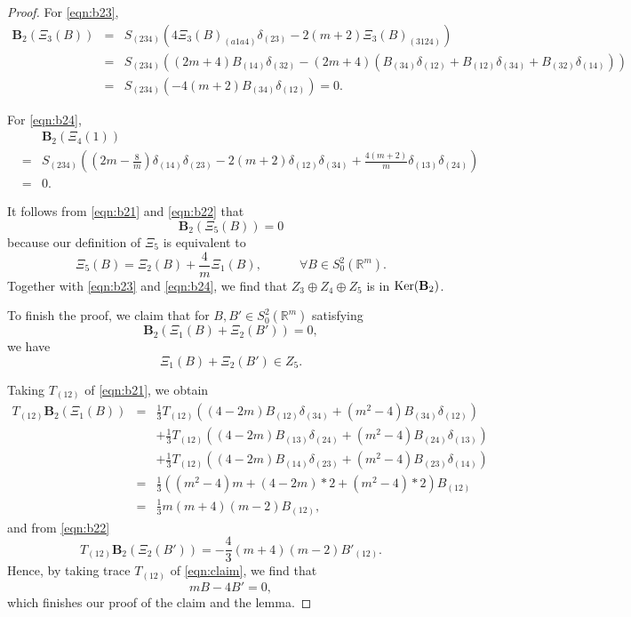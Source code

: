 \documentclass{amsart}
\newcommand{\Real}{\mathbb R}
\numberwithin{equation}{section}
\begin{document}
\begin{proof}
	For \eqref{eqn:b23}, 
	\begin{eqnarray*}
		{\mathbf B}_2(\Xi_3(B)) &=&S_{(234)} (4 \Xi_3(B)_{(a1a4)}\delta_{(23)} - 2(m+2) \Xi_3(B)_{(3124)}) \\
					&=& S_{(234)} \left( (2m+4)B_{(14)}\delta_{(32)} -(2m+4)(B_{(34)}\delta_{(12)}+B_{(12)}\delta_{(34)}+B_{(32)}\delta_{(14)}) \right) \\
					&=&S_{(234)}\left( -4(m+2) B_{(34)}\delta_{(12)} \right) =0.
	\end{eqnarray*}

	For \eqref{eqn:b24},
	\begin{eqnarray*}
	&& {\mathbf B}_2(\Xi_4(1))\\
	&=&S_{(234)} \left( (2m-\frac{8}{m}) \delta_{(14)}\delta_{(23)}-2(m+2)\delta_{(12)}\delta_{(34)}+ \frac{4(m+2)}{m}\delta_{(13)}\delta_{(24)} \right) \\
	&=&0.
	\end{eqnarray*}

	It follows from \eqref{eqn:b21} and \eqref{eqn:b22} that
	$$
	{\mathbf B}_2(\Xi_5(B))=0
	$$
	because our definition of $\Xi_5$ is equivalent to
	$$
	\Xi_5(B)= \Xi_2(B) + \frac{4}{m} \Xi_1(B), \qquad \text{} \quad \forall B\in S_0^2(\Real^m).
	$$
	Together with \eqref{eqn:b23} and \eqref{eqn:b24}, we find that $Z_3\oplus Z_4\oplus Z_5$ is in ${\rm Ker}({\mathbf B}_2)$. 

	To finish the proof, we claim that for $B, B'\in S^2_0(\Real^m)$ satisfying
	\begin{equation}
		\label{eqn:claim}
		{\mathbf B}_2 \left( \Xi_1(B)+ \Xi_2(B') \right)=0,
	\end{equation}
	we have
	$$
	\Xi_1(B)+\Xi_2(B')\in Z_5.
	$$

	Taking $T_{(12)}$ of \eqref{eqn:b21}, we obtain
	\begin{eqnarray*}
		T_{(12)} {\mathbf B}_2(\Xi_1(B)) &=& \frac{1}{3}T_{(12)} \left( (4-2m)B_{(12)}\delta_{(34)} + (m^2-4) B_{(34)}\delta_{(12)} \right) \\
						 &&+  \frac{1}{3}T_{(12)} \left( (4-2m)B_{(13)}\delta_{(24)} + (m^2-4) B_{(24)}\delta_{(13)} \right) \\
						 &&+  \frac{1}{3}T_{(12)} \left( (4-2m)B_{(14)}\delta_{(23)} + (m^2-4) B_{(23)}\delta_{(14)} \right) \\
						 &=& \frac{1}{3}\left( (m^2-4)m+ (4-2m)*2 + (m^2-4)*2 \right) B_{(12)}\\
						 &=&\frac{1}{3}m(m+4)(m-2) B_{(12)},
	\end{eqnarray*}
	and from \eqref{eqn:b22}
	$$
	T_{(12)} {\mathbf B}_2(\Xi_2(B')) = -\frac{4}{3}(m+4)(m-2) B'_{(12)}.
	$$
	Hence, by taking trace $T_{(12)}$ of \eqref{eqn:claim}, we find that
	$$
	mB-4B'=0,
	$$
	which finishes our proof of the claim and the lemma.
\end{proof}
\end{document}

